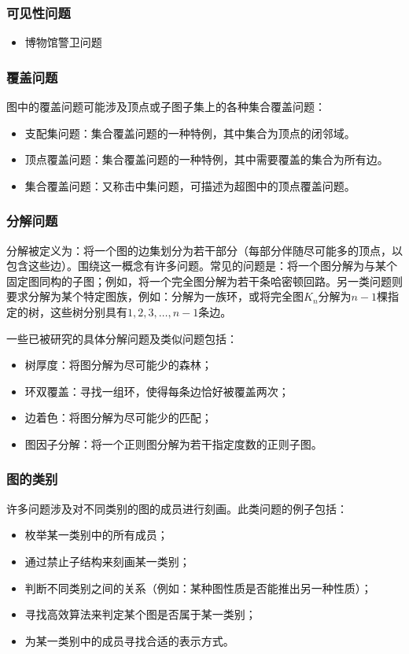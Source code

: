 \subsubsection{可见性问题}
\begin{itemize}
\item 博物馆警卫问题
\end{itemize}
\subsubsection{覆盖问题}
图中的覆盖问题可能涉及顶点或子图子集上的各种集合覆盖问题：
\begin{itemize}
\item 支配集问题：集合覆盖问题的一种特例，其中集合为顶点的闭邻域。
\item 顶点覆盖问题：集合覆盖问题的一种特例，其中需要覆盖的集合为所有边。
\item 集合覆盖问题：又称击中集问题，可描述为超图中的顶点覆盖问题。
\end{itemize}
\subsubsection{分解问题}
分解被定义为：将一个图的边集划分为若干部分（每部分伴随尽可能多的顶点，以包含这些边）。围绕这一概念有许多问题。常见的问题是：将一个图分解为与某个固定图同构的子图；例如，将一个完全图分解为若干条哈密顿回路。另一类问题则要求分解为某个特定图族，例如：分解为一族环，或将完全图$K_n$分解为$n-1$棵指定的树，这些树分别具有$1,2,3,\ldots,n-1$条边。

一些已被研究的具体分解问题及类似问题包括：
\begin{itemize}
\item 树厚度：将图分解为尽可能少的森林；
\item 环双覆盖：寻找一组环，使得每条边恰好被覆盖两次；
\item 边着色：将图分解为尽可能少的匹配；
\item 图因子分解：将一个正则图分解为若干指定度数的正则子图。
\end{itemize}
\subsubsection{图的类别}
许多问题涉及对不同类别的图的成员进行刻画。此类问题的例子包括：
\begin{itemize}
\item 枚举某一类别中的所有成员；
\item 通过禁止子结构来刻画某一类别；
\item 判断不同类别之间的关系（例如：某种图性质是否能推出另一种性质）；
\item 寻找高效算法来判定某个图是否属于某一类别；
\item 为某一类别中的成员寻找合适的表示方式。
\end{itemize}
